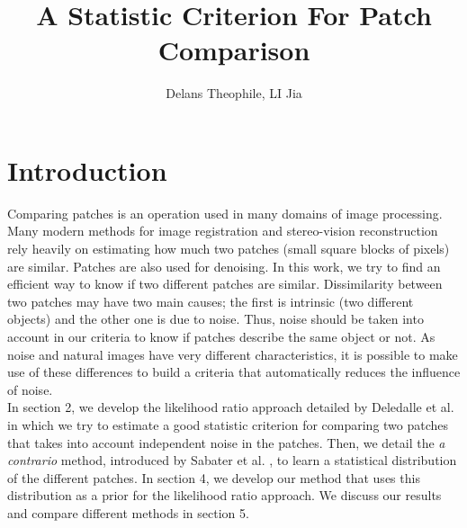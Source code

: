 \documentclass[runningheads]{llncs}
\begin{document}
\pagestyle{headings}
\mainmatter
\def\ECCV14SubNumber{979}  %
\title{A Statistic Criterion For Patch Comparison}



\author{Delans Theophile, LI Jia}


\maketitle

\section{Introduction}

Comparing patches is an operation used in many domains of image processing. Many modern methods for image registration and stereo-vision reconstruction rely heavily on estimating how much two patches (small square blocks of pixels) are similar. Patches are also used for denoising. In this work, we try to find an efficient way to know if two different patches are similar. Dissimilarity between two patches may have two main causes; the first is intrinsic (two different objects) and the other one is due to noise. Thus, noise should be taken into account in our criteria to know if patches describe the same object or not. As noise and natural images have very different characteristics, it is possible to make use of these differences to build a criteria that automatically reduces the influence of noise.
\\In section 2, we develop the likelihood ratio approach detailed by Deledalle et al. \cite{Deledalle:2012} in which we try to estimate a good statistic criterion for comparing two patches that takes into account independent noise in the patches. Then, we detail the \textit{a contrario} method, introduced by Sabater et al. \cite{Sabater:2012}, to learn a statistical distribution of the different patches. In section 4, we develop our method that uses this distribution as a prior for the likelihood ratio approach. We discuss our results and compare different methods in section 5.
\end{document}
